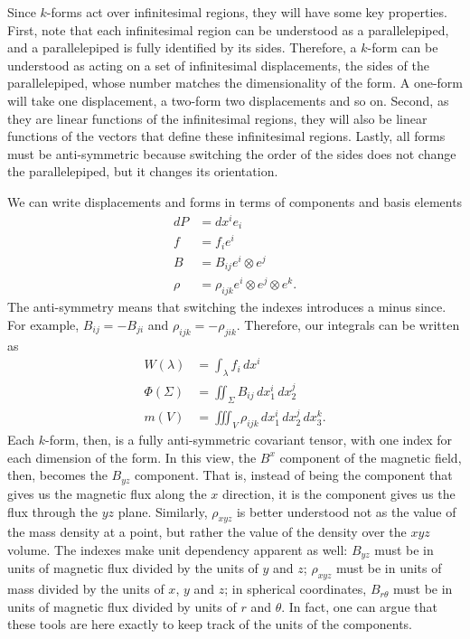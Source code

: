 Since $k$-forms act over infinitesimal regions, they will have some key properties.  First, note that each infinitesimal region can be understood as a parallelepiped, and a parallelepiped is fully identified by its sides. Therefore, a $k$-form can be understood as acting on a set of infinitesimal displacements, the sides of the parallelepiped, whose number matches the dimensionality of the form. A one-form will take one displacement, a two-form two displacements and so on. Second, as they are linear functions of the infinitesimal regions, they will also be linear functions of the vectors that define these infinitesimal regions. Lastly, all forms must be anti-symmetric because switching the order of the sides does not change the parallelepiped, but it changes its orientation.

We can write displacements and forms in terms of components and basis elements
\begin{equation}
	\begin{aligned}
	dP &= dx^i e_i \\
		f &= f_i e^i \\
		B &= B_{ij} e^i \otimes e^j \\
		\rho &= \rho_{ijk} e^i \otimes e^j \otimes e^k.
	\end{aligned}
\end{equation}
The anti-symmetry means that switching the indexes introduces a minus since. For example, $B_{ij} = - B_{ji}$ and $\rho_{ijk} = - \rho_{jik}$. Therefore, our integrals can be written as
\begin{equation}
	\begin{aligned}
		W(\lambda) &= \int_\lambda f_i \, dx^i \\
		\Phi(\Sigma) &= \iint_\Sigma B_{ij} \, dx_1^i \, dx_2^j \\
		m(V) &= \iiint_V \rho_{ijk} \, dx_1^i \, dx_2^j \, dx_3^k.
	\end{aligned}
\end{equation}
Each $k$-form, then, is a fully anti-symmetric covariant tensor, with one index for each dimension of the form. In this view, the $B^x$ component of the magnetic field, then, becomes the $B_{yz}$ component. That is, instead of being the component that gives us the magnetic flux along the $x$ direction, it is the component gives us the flux through the $yz$ plane. Similarly, $\rho_{xyz}$ is better understood not as the value of the mass density at a point, but rather the value of the density over the $xyz$ volume. The indexes make unit dependency apparent as well: $B_{yz}$ must be in units of magnetic flux divided by the units of $y$ and $z$; $\rho_{xyz}$ must be in units of mass divided by the units of $x$, $y$ and $z$; in spherical coordinates, $B_{r\theta}$ must be in units of magnetic flux divided by units of $r$ and $\theta$. In fact, one can argue that these tools are here exactly to keep track of the units of the components.

